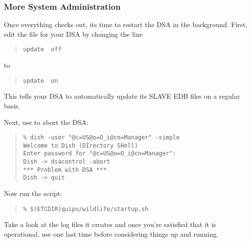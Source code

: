 \subsubsection	{More System Administration}
Once everything checks out,
its time to restart the DSA in the background.
First, edit the  file for your DSA by changing the
line
\begin{quote}\small\begin{verbatim}
update  off
\end{verbatim}\end{quote}
to
\begin{quote}\small\begin{verbatim}
update  on
\end{verbatim}\end{quote}
This tells your DSA to automatically update its SLAVE EDB files on a regular
basis.

Next, use  to abort the DSA:
\begin{quote}\small\begin{verbatim}
% dish -user "@c=US@o=O_i@cn=Manager" -simple
Welcome to Dish (DIrectory SHell)
Enter password for "@c=US@o=O_i@cn=Manager": 
Dish -> dsacontrol -abort
*** Problem with DSA ***
Dish -> quit
\end{verbatim}\end{quote}
Now run the  script:
\begin{quote}\small\begin{verbatim}
% $(ETCDIR)quipu/wildlife/startup.sh
\end{verbatim}\end{quote}
Take a look at the log files it creates and once you're satisfied
that it is operational,
use  one last time before considering things up and running.

